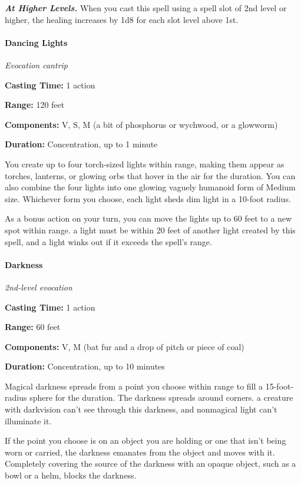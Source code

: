 \documentclass[
]{article}
\begin{document}
\emph{\textbf{At Higher Levels.}} When you cast this spell using a spell
slot of 2nd level or higher, the healing increases by 1d8 for each slot
level above 1st.

\hypertarget{dancing-lights}{%
\paragraph{Dancing Lights}\label{dancing-lights}}

\emph{Evocation cantrip}

\textbf{Casting Time:} 1 action

\textbf{Range:} 120 feet

\textbf{Components:} V, S, M (a bit of phosphorus or wychwood, or a
glowworm)

\textbf{Duration:} Concentration, up to 1 minute

You create up to four torch-sized lights within range, making them
appear as torches, lanterns, or glowing orbs that hover in the air for
the duration. You can also combine the four lights into one glowing
vaguely humanoid form of Medium size. Whichever form you choose, each
light sheds dim light in a 10-foot radius.

As a bonus action on your turn, you can move the lights up to 60 feet to
a new spot within range. a light must be within 20 feet of another light
created by this spell, and a light winks out if it exceeds the spell's
range.

\hypertarget{darkness}{%
\paragraph{Darkness}\label{darkness}}

\emph{2nd-level evocation}

\textbf{Casting Time:} 1 action

\textbf{Range:} 60 feet

\textbf{Components:} V, M (bat fur and a drop of pitch or piece of coal)

\textbf{Duration:} Concentration, up to 10 minutes

Magical darkness spreads from a point you choose within range to fill a
15-foot-radius sphere for the duration. The darkness spreads around
corners. a creature with darkvision can't see through this darkness, and
nonmagical light can't illuminate it.

If the point you choose is on an object you are holding or one that
isn't being worn or carried, the darkness emanates from the object and
moves with it. Completely covering the source of the darkness with an
opaque object, such as a bowl or a helm, blocks the darkness.
\end{document}
